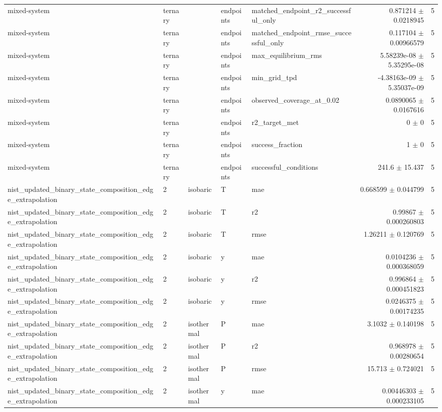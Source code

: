\begin{tabular}{lllllrr}
mixed-system & ternary &  & endpoints & matched_endpoint_r2_successful_only & 0.871214 $\pm$ 0.0218945 & 5 \\
mixed-system & ternary &  & endpoints & matched_endpoint_rmse_successful_only & 0.117104 $\pm$ 0.00966579 & 5 \\
mixed-system & ternary &  & endpoints & max_equilibrium_rms & 5.58239e-08 $\pm$ 5.35295e-08 & 5 \\
mixed-system & ternary &  & endpoints & min_grid_tpd & -4.38163e-09 $\pm$ 5.35037e-09 & 5 \\
mixed-system & ternary &  & endpoints & observed_coverage_at_0.02 & 0.0890065 $\pm$ 0.0167616 & 5 \\
mixed-system & ternary &  & endpoints & r2_target_met & 0 $\pm$ 0 & 5 \\
mixed-system & ternary &  & endpoints & success_fraction & 1 $\pm$ 0 & 5 \\
mixed-system & ternary &  & endpoints & successful_conditions & 241.6 $\pm$ 15.437 & 5 \\
nist\_updated\_binary\_state\_composition\_edge\_extrapolation & 2 & isobaric & T & mae & 0.668599 $\pm$ 0.044799 & 5 \\
nist\_updated\_binary\_state\_composition\_edge\_extrapolation & 2 & isobaric & T & r2 & 0.99867 $\pm$ 0.000260803 & 5 \\
nist\_updated\_binary\_state\_composition\_edge\_extrapolation & 2 & isobaric & T & rmse & 1.26211 $\pm$ 0.120769 & 5 \\
nist\_updated\_binary\_state\_composition\_edge\_extrapolation & 2 & isobaric & y & mae & 0.0104236 $\pm$ 0.000368059 & 5 \\
nist\_updated\_binary\_state\_composition\_edge\_extrapolation & 2 & isobaric & y & r2 & 0.996864 $\pm$ 0.000451823 & 5 \\
nist\_updated\_binary\_state\_composition\_edge\_extrapolation & 2 & isobaric & y & rmse & 0.0246375 $\pm$ 0.00174235 & 5 \\
nist\_updated\_binary\_state\_composition\_edge\_extrapolation & 2 & isothermal & P & mae & 3.1032 $\pm$ 0.140198 & 5 \\
nist\_updated\_binary\_state\_composition\_edge\_extrapolation & 2 & isothermal & P & r2 & 0.968978 $\pm$ 0.00280654 & 5 \\
nist\_updated\_binary\_state\_composition\_edge\_extrapolation & 2 & isothermal & P & rmse & 15.713 $\pm$ 0.724021 & 5 \\
nist\_updated\_binary\_state\_composition\_edge\_extrapolation & 2 & isothermal & y & mae & 0.00446303 $\pm$ 0.000233105 & 5 \\

\end{tabular}
